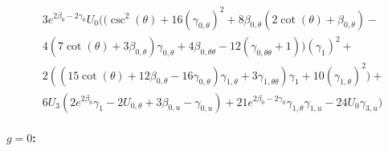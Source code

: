 \documentclass[a4paper,11pt]{article}
\numberwithin{equation}{section}
\begin{document}
\begin{align}
\begin{split}
&3 e^{2\beta_{0}-2\gamma_{0}} U_{0} ((\csc ^2(\theta )+16 (\gamma_{0,\theta})^2+8\beta_{0,\theta} (2 \cot (\theta )+\beta_{0,\theta})-\\
&4 (7 \cot (\theta )+3\beta_{0,\theta})\gamma_{0, \theta}+4\beta_{0, \theta \theta}-12 (\gamma_{0, \theta \theta}+1)) (\gamma_{1})^2+\\
&2 ((15 \cot (\theta )+12\beta_{0,\theta}-16\gamma_{0, \theta})\gamma_{1,\theta}+3\gamma_{1, \theta \theta})\gamma_{1}+10 (\gamma_{1, \theta})^2)+\\
&6 U_{3} (2 e^{2\beta_{0}}\gamma_{1}-2 U_{0, \theta}+3\beta_{0,u}-\gamma_{0,u})+21 e^{2\beta_{0}-2\gamma_{0}}\gamma_{1,\theta}\gamma_{1,u}-24 U_{0} \gamma_{3,u})
\end{split}
\end{align}

\textbf{$g=0$:}
\end{document}
